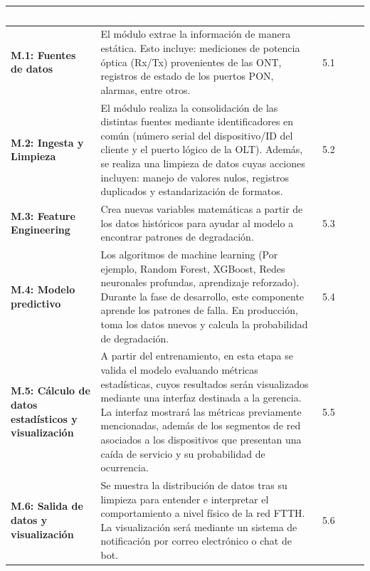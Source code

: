 \documentclass[12pt,a4paper]{article}
\begin{document}
                    \begin{table}[H]
                        \centering
                        \begin{tabularx}{\textwidth}{|p{3.5cm}|X|p{2cm}|}
                            \hline
                            \rowcolor{black} 
                            \textcolor{white}{Módulos} & \textcolor{white}{Propósito} & \textcolor{white}{Sección}  \\ \hline
                            
                            \textbf{M.1: Fuentes de datos} & El módulo extrae la información de manera estática. Esto incluye: mediciones de potencia óptica (Rx/Tx) provenientes de las ONT, registros de estado de los puertos PON, alarmas, entre otros. & 5.1 \\ \hline
                            \textbf{M.2: Ingesta y Limpieza} & El módulo realiza la consolidación de las distintas fuentes mediante identificadores en común (número serial del dispositivo/ID del cliente y el puerto lógico de la OLT). Además, se realiza una limpieza de datos cuyas acciones incluyen: manejo de valores nulos, registros duplicados y estandarización de formatos. & 5.2 \\ \hline
                            \textbf{M.3: Feature Engineering} & Crea nuevas variables matemáticas a partir de los datos históricos para ayudar al modelo a encontrar patrones de degradación. & 5.3 \\ \hline
                            \textbf{M.4: Modelo predictivo} & Los algoritmos de machine learning (Por ejemplo, Random Forest, XGBoost, Redes neuronales profundas, aprendizaje reforzado). Durante la fase de desarrollo, este componente aprende los patrones de falla. En producción, toma los datos nuevos y calcula la probabilidad de degradación. & 5.4 \\ \hline
                            \textbf{M.5: Cálculo de datos estadísticos y visualización} & A partir del entrenamiento, en esta etapa se valida el modelo evaluando métricas estadísticas, cuyos resultados serán visualizados mediante una interfaz destinada a la gerencia. La interfaz mostrará las métricas previamente mencionadas, además de los segmentos de red asociados a los dispositivos que presentan una caída de servicio y su probabilidad de ocurrencia. & 5.5 \\ \hline
                            \textbf{M.6: Salida de datos y visualización} & Se muestra la distribución de datos tras su limpieza para entender e interpretar el comportamiento a nivel físico de la red FTTH. La visualización será mediante un sistema de notificación por correo electrónico o chat de bot. & 5.6 \\ \hline
                        \end{tabularx}
                    \end{table}
\end{document}
